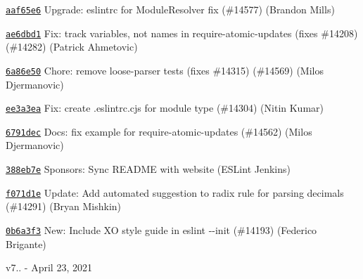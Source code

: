 \begin{DoxyItemize}
\item \href{https://github.com/eslint/eslint/commit/aaf65e629adb74401092c3ccc9cb4e4bd1c8609b}{\texttt{ {\ttfamily aaf65e6}}} Upgrade\+: eslintrc for Module\+Resolver fix (\#14577) (Brandon Mills)
\item \href{https://github.com/eslint/eslint/commit/ae6dbd148aaca83e4bd04b9351b54029c50fac8a}{\texttt{ {\ttfamily ae6dbd1}}} Fix\+: track variables, not names in require-\/atomic-\/updates (fixes \#14208) (\#14282) (Patrick Ahmetovic)
\item \href{https://github.com/eslint/eslint/commit/6a86e5018a3733049c09261bcabae422fbea893d}{\texttt{ {\ttfamily 6a86e50}}} Chore\+: remove loose-\/parser tests (fixes \#14315) (\#14569) (Milos Djermanovic)
\item \href{https://github.com/eslint/eslint/commit/ee3a3ead893d185cc4b1ae9041940cb0968767e1}{\texttt{ {\ttfamily ee3a3ea}}} Fix\+: create {\ttfamily .eslintrc.\+cjs} for {\ttfamily module} type (\#14304) (Nitin Kumar)
\item \href{https://github.com/eslint/eslint/commit/6791decfc58b7b09cfd0aabd15a3d14148aae073}{\texttt{ {\ttfamily 6791dec}}} Docs\+: fix example for require-\/atomic-\/updates (\#14562) (Milos Djermanovic)
\item \href{https://github.com/eslint/eslint/commit/388eb7e14039b8951462b311d6121002ca5232cb}{\texttt{ {\ttfamily 388eb7e}}} Sponsors\+: Sync README with website (ESLint Jenkins)
\item \href{https://github.com/eslint/eslint/commit/f071d1ef91286bf2e3fb63d9b679ff7702819a1e}{\texttt{ {\ttfamily f071d1e}}} Update\+: Add automated suggestion to {\ttfamily radix} rule for parsing decimals (\#14291) (Bryan Mishkin)
\item \href{https://github.com/eslint/eslint/commit/0b6a3f31e6e78825114f82d4e0aed9cd72f784ac}{\texttt{ {\ttfamily 0b6a3f3}}} New\+: Include XO style guide in {\ttfamily eslint -\/-\/init} (\#14193) (Federico Brigante)
\end{DoxyItemize}

v7.. -\/ April 23, 2021



